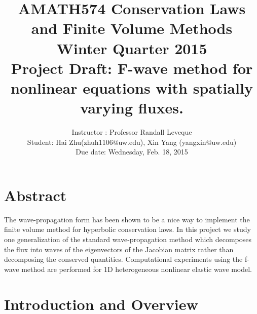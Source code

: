 \documentclass{article}
\begin{document}
\title{AMATH574 Conservation Laws and Finite Volume Methods\\ Winter Quarter 2015\\ Project Draft: F-wave method for nonlinear equations with spatially varying fluxes.}
\author{Instructor : Professor Randall Leveque\\ Student: Hai Zhu(zhuh1106@uw.edu), Xin Yang (yangxin@uw.edu)\\ Due date: Wednesday, Feb. 18, 2015}
\maketitle

\section{Abstract}
The wave-propagation form has been shown to be a nice way to implement the finite volume method for hyperbolic conservation laws. In this project we study one generalization of the standard wave-propagation method which decomposes the flux into waves of the eigenvectors of the Jacobian matrix rather than decomposing the conserved quantities. Computational experiments using the f-wave method are performed for 1D heterogeneous nonlinear elastic wave model.
\section{Introduction and Overview}
\end{document}

